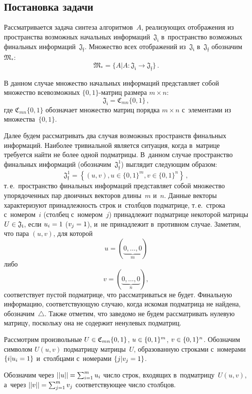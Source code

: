 \begin{multicols}{2}
\section{Постановка задачи}

Рассматривается задача синтеза алгоритмов~$A$, реализующих отображения из 
пространства возможных начальных информаций~$\mathfrak{J_i}$ в~пространство 
возможных финальных информаций~$\mathfrak{J_f}$.
Множество всех отображений из~$\mathfrak{J_i}$ в~$\mathfrak{J_f}$ обозначим~$\mathfrak{M_*}$:
$$
\mathfrak{M_*} = \{A|A:\mathfrak{J_i} \rightarrow \mathfrak{J_f}\}\,.
$$

В данном случае множество начальных информаций представляет собой множество 
всевозможных $\{0,1\}$-мат\-риц размера $m \times n$:
$$
\mathfrak{J_i} =  \mathfrak{C}_{mn}\{0,1\}\,,$$
где $\mathfrak{C}_{mn}\{0,1\}$ 
обозначает множество матриц порядка $m\times n$ с~элементами из 
множества~$\{0,1\}.$

Далее будем рассматривать два случая возможных пространств финальных информаций.
 Наиболее тривиальной является ситуация, когда в~мат\-ри\-це требуется найти не 
более одной подматрицы.
 В~данном случае пространство финальных информаций (обозначим~$\mathfrak{J_f^1}$) 
 выглядит следующим образом:
$$
\mathfrak{J_f^1} = \left\{(u, v), u \in \{0,1\}^m, v \in \{0,1\}^n\right\}\,,
$$
 т.\,е.\ 
пространство финальных информаций представляет собой множество упорядоченных пар 
двоичных векторов длины~$m$ и~$n$.
Данные векторы характеризуют принадлежность строк и~столбцов подматрице, т.\,е.\ 
строка с~номером~$i$ (столбец с~номером~$j$) принадлежит подматрице некоторой 
мат\-ри\-цы $U \hm\in \mathfrak{J_i}$, если $u_i \hm=1$ ($v_j\hm= 1$), и~не принадлежит 
в~противном случае. Заметим, что пара $(u, v)$, для которой 
$$
u= 
(\underbrace{0,\dots, 0}_m)$$
 либо 
 $$
 v= (\underbrace{0,\dots, 0}_n),$$ 
соответствует пус\-той подматрице, что рассматриваться не будет. Финальную 
информацию, со\-от\-вет\-ст\-ву\-ющую случаю, когда искомая подматрица не найдена, 
обозначим~$\triangle$. Также отметим, что заведомо не будем рассматривать 
нулевую матрицу, поскольку она не содержит ненулевых подматриц.

Рассмотрим произвольные $U \hm\in \mathfrak{C}_{mn}\{0,1\}$,  $u\hm \in \{0,1\}^m$, 
$v\hm \in \{0,1\}^n$. Обозначим символом $U(u,v)$ подматрицу матрицы~$U$, 
образованную строками с~номерами $\{i|u_i\hm=1\}$ и~столбцами с~номерами 
$\{j|v_j\hm=1\}$.

Обозначим через $||u|| \hm=\sum\nolimits_{i=1}^m u_i$ число строк, входящих 
в~подматрицу~$U(u,v)$, а~через   $||v||\hm=\sum\nolimits_{j=1}^m v_j$ 
соответствующее чис\-ло столбцов.


\end{multicols}
